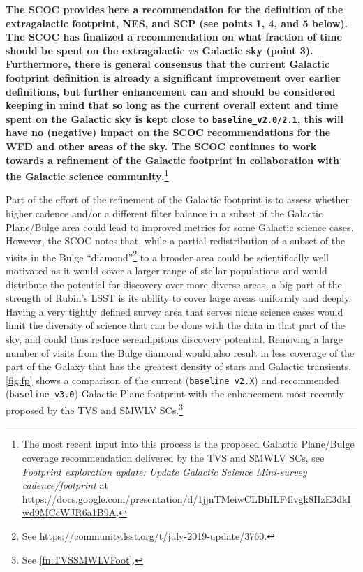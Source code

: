{\bf The SCOC provides here a recommendation for the definition of the extragalactic footprint, NES, and SCP (see points 1, 4, and 5 below). The SCOC has finalized a recommendation on what fraction of time should be spent on the extragalactic \emph{vs} Galactic sky (point 3). Furthermore, there is general consensus that the current Galactic footprint definition is already a significant improvement over earlier definitions, but further enhancement can and should be considered keeping in mind that so long as the current overall extent and time spent on the Galactic sky is kept close to \texttt{baseline\_v2.0/2.1}, this will have no (negative) impact on the SCOC recommendations for the WFD and other areas of the sky. The SCOC continues to work towards a refinement of the Galactic footprint in collaboration with the Galactic science community}.\footnote{\label{fn:TVSSMWLVFoot}The most recent input into this process is the proposed Galactic Plane/Bulge coverage recommendation delivered by the TVS and SMWLV SCs, see \emph{Footprint exploration update: Update Galactic Science Mini-survey cadence/footprint} at \url{https://docs.google.com/presentation/d/1jjnTMeiwCLBhILF4lvgk8HzE3dkIwd9MCcWJR6a1B9A}.}
 
 Part of the effort of the refinement of the Galactic footprint is to assess whether higher cadence and/or a different filter balance in a subset of the Galactic Plane/Bulge area could lead to improved metrics for some Galactic science cases. However, the SCOC notes that, while a partial redistribution of a subset of the visits in the Bulge ``diamond''\footnote{See \url{https://community.lsst.org/t/july-2019-update/3760}.} to a broader area could be scientifically well motivated as it would cover a larger range of stellar populations and would distribute the potential for discovery over more diverse areas, a big part of the strength of Rubin’s LSST is its ability to cover large areas uniformly and deeply. Having a very tightly defined survey area that serves niche science cases would limit the diversity of science that can be done with the data in that part of the sky, and could thus reduce serendipitous discovery potential. Removing a large number of visits from the Bulge diamond would also result in less coverage of the part of the Galaxy that has the greatest density of stars and Galactic transients. \autoref{fig:fp} shows a comparison of the current (\texttt{baseline\_v2.X}) and recommended (\texttt{baseline\_v3.0}) 
 Galactic Plane footprint with the enhancement most recently proposed by the TVS and SMWLV SCs.\footnote{See \autoref{fn:TVSSMWLVFoot}.}

